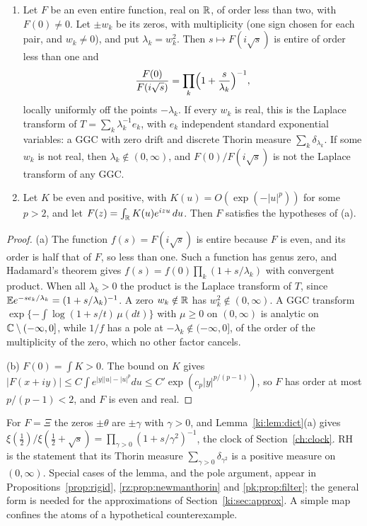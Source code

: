 \begin{lemma}\label{ki:lem:dict}
\begin{enumerate}
\item[(a)] Let $F$ be an even entire function, real on $\mathbb{R}$, of order less than two, with $F(0)\ne0$. Let $\pm w_k$ be its zeros, with multiplicity (one sign chosen for each pair, and $w_k\ne0$), and put $\lambda_k=w_k^2$. Then $s\mapsto F(i\sqrt s)$ is entire of order less than one and
\[
\frac{F(0)}{F(i\sqrt s)}=\prod_k\Bigl(1+\frac{s}{\lambda_k}\Bigr)^{-1},
\]
locally uniformly off the points $-\lambda_k$. If every $w_k$ is real, this is the Laplace transform of $T=\sum_k\lambda_k^{-1}e_k$, with $e_k$ independent standard exponential variables: a GGC with zero drift and discrete Thorin measure $\sum_k\delta_{\lambda_k}$. If some $w_k$ is not real, then $\lambda_k\notin(0,\infty)$, and $F(0)/F(i\sqrt s)$ is not the Laplace transform of any GGC.
\item[(b)] Let $K$ be even and positive, with $K(u)=O(\exp(-|u|^p))$ for some $p>2$, and let $F(z)=\int_{\mathbb{R}}K(u)e^{izu}\,du$. Then $F$ satisfies the hypotheses of (a).
\end{enumerate}
\end{lemma}

\begin{proof}
(a) The function $f(s)=F(i\sqrt s)$ is entire because $F$ is even, and its order is half that of $F$, so less than one. Such a function has genus zero, and Hadamard's theorem gives $f(s)=f(0)\prod_k(1+s/\lambda_k)$ with convergent product. When all $\lambda_k>0$ the product is the Laplace transform of $T$, since $\mathbb{E} e^{-se_k/\lambda_k}=(1+s/\lambda_k)^{-1}$. A zero $w_k\notin\mathbb{R}$ has $w_k^2\notin(0,\infty)$. A GGC transform $\exp\{-\int\log(1+s/t)\,\mu(dt)\}$ with $\mu\ge0$ on $(0,\infty)$ is analytic on $\mathbb{C}\setminus(-\infty,0]$, while $1/f$ has a pole at $-\lambda_k\notin(-\infty,0]$, of the order of the multiplicity of the zero, which no other factor cancels.

(b) $F(0)=\int K>0$. The bound on $K$ gives $|F(x+iy)|\le C\int e^{|y||u|-|u|^p}du\le C'\exp(c_p|y|^{p/(p-1)})$, so $F$ has order at most $p/(p-1)<2$, and $F$ is even and real.
\end{proof}

For $F=\Xi$ the zeros $\pm\theta$ are $\pm\gamma$ with $\gamma>0$, and Lemma~\ref{ki:lem:dict}(a) gives $\xi(\tfrac12)/\xi(\tfrac12+\sqrt s)=\prod_{\gamma>0}(1+s/\gamma^2)^{-1}$, the clock of Section~\ref{ch:clock}. RH is the statement that its Thorin measure $\sum_{\gamma>0}\delta_{\gamma^2}$ is a positive measure on $(0,\infty)$. Special cases of the lemma, and the pole argument, appear in Propositions~\ref{prop:rigid}, \ref{rz:prop:newmanthorin} and \ref{pk:prop:filter}; the general form is needed for the approximations of Section~\ref{ki:sec:approx}. A simple map confines the atoms of a hypothetical counterexample.


